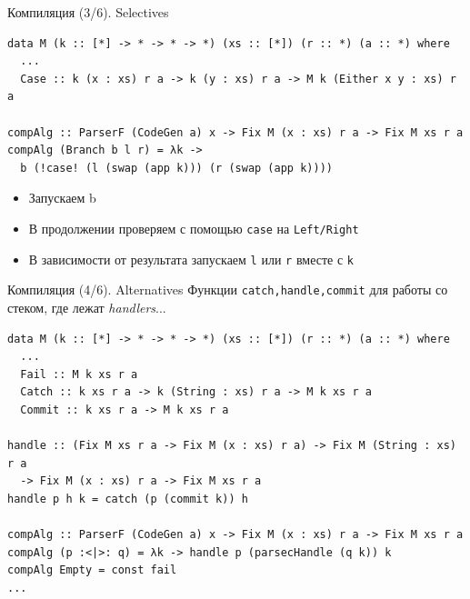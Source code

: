\begin{frame}[fragile]{Компиляция (3/6). Selectives }
\begin{verbatim}
data M (k :: [*] -> * -> * -> *) (xs :: [*]) (r :: *) (a :: *) where
  ...
  Case :: k (x : xs) r a -> k (y : xs) r a -> M k (Either x y : xs) r a
  
compAlg :: ParserF (CodeGen a) x -> Fix M (x : xs) r a -> Fix M xs r a  
compAlg (Branch b l r) = λk -> 
  b (!case! (l (swap (app k))) (r (swap (app k))))
\end{verbatim}
\newln 

\begin{itemize}
\item Запускаем b
\item В продолжении проверяем с помощью \verb=case= на \texttt{Left/Right}
\item В зависимости от результата запускаем \texttt{l}
или \texttt{r} вместе с \texttt{k}
\end{itemize}
\end{frame}

\begin{frame}[fragile]{Компиляция (4/6). Alternatives}
Функции \texttt{catch,handle,commit} для работы со стеком, где лежат \emph{handlers}...

\begin{verbatim}
data M (k :: [*] -> * -> * -> *) (xs :: [*]) (r :: *) (a :: *) where
  ...
  Fail :: M k xs r a
  Catch :: k xs r a -> k (String : xs) r a -> M k xs r a
  Commit :: k xs r a -> M k xs r a
  
handle :: (Fix M xs r a -> Fix M (x : xs) r a) -> Fix M (String : xs) r a
  -> Fix M (x : xs) r a -> Fix M xs r a
handle p h k = catch (p (commit k)) h

compAlg :: ParserF (CodeGen a) x -> Fix M (x : xs) r a -> Fix M xs r a
compAlg (p :<|>: q) = λk -> handle p (parsecHandle (q k)) k
compAlg Empty = const fail
...
\end{verbatim}
\end{frame}



